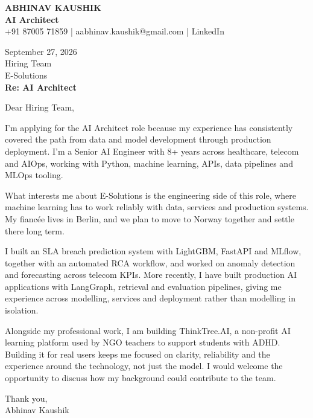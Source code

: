 \documentclass[10pt,a4paper]{article}
\begin{document}
\begin{center}
{\Large\bfseries ABHINAV KAUSHIK}\\[2pt]
{\bfseries AI Architect}\\[2pt]
+91 87005 71859 \quad | \quad aabhinav.kaushik@gmail.com \quad | \quad LinkedIn
\end{center}
\vspace{8pt}
September 27, 2026\\[6pt]
Hiring Team\\
E-Solutions\\[4pt]
\textbf{Re: AI Architect}

Dear Hiring Team,

I’m applying for the AI Architect role because my experience has consistently covered the path from data and model development through production deployment. I’m a Senior AI Engineer with 8+ years across healthcare, telecom and AIOps, working with Python, machine learning, APIs, data pipelines and MLOps tooling.

What interests me about E-Solutions is the engineering side of this role, where machine learning has to work reliably with data, services and production systems. My fiancée lives in Berlin, and we plan to move to Norway together and settle there long term.

I built an SLA breach prediction system with LightGBM, FastAPI and MLflow, together with an automated RCA workflow, and worked on anomaly detection and forecasting across telecom KPIs. More recently, I have built production AI applications with LangGraph, retrieval and evaluation pipelines, giving me experience across modelling, services and deployment rather than modelling in isolation.

Alongside my professional work, I am building ThinkTree.AI, a non-profit AI learning platform used by NGO teachers to support students with ADHD. Building it for real users keeps me focused on clarity, reliability and the experience around the technology, not just the model. I would welcome the opportunity to discuss how my background could contribute to the team.

Thank you,\\
Abhinav Kaushik
\end{document}
